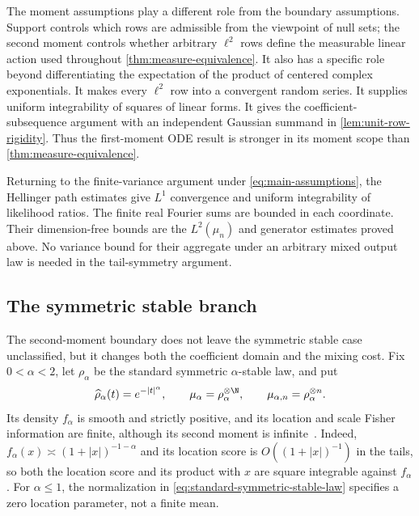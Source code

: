 The moment assumptions play a different role from the boundary assumptions.
Support controls which rows are admissible from the viewpoint of null sets;
the second moment controls whether arbitrary \(\ell^2\) rows define the
measurable linear action used throughout \cref{thm:measure-equivalence}.
It also has a specific role beyond differentiating the expectation of the
product of centered complex exponentials.
It makes every \(\ell^2\) row into a convergent random series.
It supplies uniform integrability of squares of linear forms.
It gives the coefficient-subsequence argument with an independent Gaussian
summand in \cref{lem:unit-row-rigidity}.
Thus the first-moment ODE result is stronger in its moment scope than
\cref{thm:measure-equivalence}.

Returning to the finite-variance argument under
\eqref{eq:main-assumptions}, the Hellinger path estimates give \(L^1\)
convergence and uniform integrability of likelihood ratios.
The finite real Fourier sums are bounded in each coordinate.
Their dimension-free bounds are the \(L^2(\mu_n)\) and generator estimates
proved above.
No variance bound for their aggregate under an arbitrary mixed output law is
needed in the tail-symmetry argument.

\subsection{The symmetric stable branch}
\label{sec:symmetric-stable-branch}

The second-moment boundary does not leave the symmetric stable case
unclassified, but it changes both the coefficient domain and the mixing
cost.
Fix \(0<\alpha<2\), let \(\rho_\alpha\) be the standard symmetric
\(\alpha\)-stable law, and put
\begin{equation}
 \widehat\rho_\alpha(t)=e^{-|t|^\alpha},
 \qquad
 \mu_\alpha=\rho_\alpha^{\otimes\N},
 \qquad
 \mu_{\alpha,n}=\rho_\alpha^{\otimes n}.
 \label{eq:standard-symmetric-stable-law}
\end{equation}
Its density \(f_\alpha\) is smooth and strictly positive, and its location
and scale Fisher information are finite, although its second moment is
infinite~\cite{bobkov2014stable}.
Indeed, \(f_\alpha(x)\asymp(1+|x|)^{-1-\alpha}\) and its location score is
\(O((1+|x|)^{-1})\) in the tails, so both the location score and its product
with \(x\) are square integrable against \(f_\alpha\).
For \(\alpha\le1\), the normalization in
\eqref{eq:standard-symmetric-stable-law} specifies a zero location parameter,
not a finite mean.

